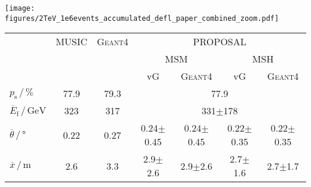\begin{figure*}
    \centering 
    \texttt{[image: figures/2TeV\_1e6events\_accumulated\_defl\_paper\_combined\_zoom.pdf]}
    \caption{A comparison of the results of MUSIC, \textsc{Geant4}, and PROPOSAL is presented for $\num{e6}$ muons propagated with 
    $E_{\text{i}} = \SI{2}{\tera\electronvolt}$ over a distance of 
    $\SI{3}{\kilo\meter}$ in water. A $v_{\mathrm{cut}} = \num{e-3}$ is set. In PROPOSAL, 
    bremsstrahlung and photonuclear interaction deflections are parametrized either by 
    Van Ginneken (vG) or as in \textsc{Geant4}. Both multiple scattering by Molière (MSM) and Highland (MSH) are checked. 
    Left: The accumulated deflection $\theta_{\mathrm{acc}}$ in degree is very similar in all cases.
    Right: The lateral displacement $x$ in meter depends 
    on the scattering method. MSM leads to larger distances.
    In the zoomed-in figure, the region around the mode of the distributions is presented. 
    The mode of \textsc{Geant4} is shifted to larger deflections.
    Detailed information are given in 
    Table~\ref{tab:compare_MUSIC}. The results for MUSIC and \textsc{Geant4} are taken from 
    Ref.~\cite{comparison_MUSIC_GEANT4_2009}.}
    \label{fig:compare_MUSIC}
\end{figure*}
\begin{table*}
    \small
    \centering
    \caption{The survival probability $p_{\text{s}}$ defined by the ratio of all 
    muons that reach the propagation distance of $\SI{3}{\kilo\meter}$ and the 
    amount of muons stopping before due to large energy losses and muon decays,
    the mean survived muon 
    energy $\overline{E}_{\text{f}}$, the mean scattered angle $\overline{\theta}$,
    and the mean displacement $\overline{x}$ are presented for all cases from 
    Figure~\ref{fig:compare_MUSIC}. For all means, the standard deviation is given.
    The largest deflection and displacement is observed in the tool \textsc{Geant4}, which has the lowest mean survived energy. The lower the energy, the larger the deflection.}
    \begin{tabular}{l|cc|cccc}
        \toprule
        & MUSIC & \textsc{Geant4} & \multicolumn{4}{c}{PROPOSAL} \\
        &  & & \multicolumn{2}{c}{MSM} & 
        \multicolumn{2}{c}{MSH} \\
        &  &  & vG & \textsc{Geant4} & vG & \textsc{Geant4} \\
        \midrule
        $p_{\text{s}}\,/\,\si{\percent}$ & 77.9 & 79.3 &  \multicolumn{4}{c}{77.9}\\
        $\overline{E}_{\text{f}}\,/\,\si{\giga\electronvolt}$ & 323 & 317 & \multicolumn{4}{c}{331$\pm$178} \\
        $\overline{\theta}\,/\,\si{\degree}$ & 0.22 & 0.27 & 0.24$\pm$0.45 & 0.24$\pm$0.45 & 0.22$\pm$0.35 & 0.22$\pm$0.35   \\
        $\overline{x}\,/\,\si{\meter}$ & 2.6 & 3.3 & 2.9$\pm$2.6 & 2.9$\pm$2.6 & 2.7$\pm$1.6 & 2.7$\pm$1.7  \\
     \bottomrule
    \end{tabular}
    \label{tab:compare_MUSIC}
\end{table*}

